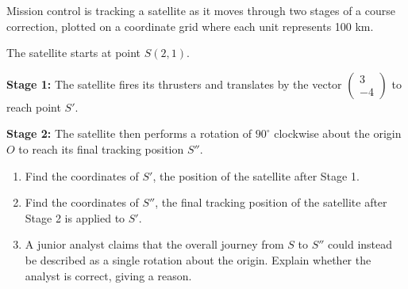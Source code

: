 \begin{question}
\noindent Mission control is tracking a satellite as it moves through two stages of a course correction, plotted on a coordinate grid where each unit represents 100 km.

\noindent The satellite starts at point $S(2,1)$.

\medskip
\noindent \textbf{Stage 1:} The satellite fires its thrusters and translates by the vector $\begin{pmatrix} 3 \\ -4 \end{pmatrix}$ to reach point $S'$.

\noindent \textbf{Stage 2:} The satellite then performs a rotation of $90^\circ$ clockwise about the origin $O$ to reach its final tracking position $S''$.

\begin{center}
\end{center}

\begin{enumerate}
    \item[(a)] Find the coordinates of $S'$, the position of the satellite after Stage 1.

    \vspace{2.5cm}

    \item[(b)] Find the coordinates of $S''$, the final tracking position of the satellite after Stage 2 is applied to $S'$.

    \vspace{3.5cm}

    \item[(c)] A junior analyst claims that the overall journey from $S$ to $S''$ could instead be described as a single rotation about the origin. Explain whether the analyst is correct, giving a reason.

    \vspace{3.5cm}
\end{enumerate}
\end{question}
